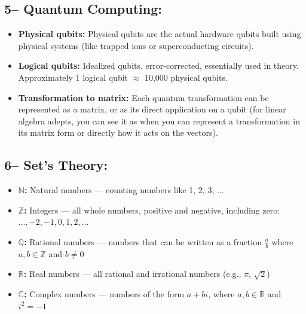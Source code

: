 \subsection*{5– Quantum Computing:}
\begin{itemize}
    \item \textbf{Physical qubits:} Physical qubits are the actual hardware qubits built using physical systems (like trapped ions or superconducting circuits).

    \item \textbf{Logical qubits:} Idealized qubits, error-corrected, essentially used in theory. Approximately 1 logical qubit \( \approx \) 10,000 physical qubits.

    \item \textbf{Transformation to matrix:} Each quantum transformation can be represented as a matrix, or as its direct application on a qubit (for linear algebra adepts, you can see it as when you can represent a transformation in its matrix form or directly how it acts on the vectors).
\end{itemize}

\subsection*{6– Set’s Theory:}   
\begin{itemize}
    \item \textbf{\( \mathbb{N} \):} Natural numbers — counting numbers like 1, 2, 3, ...

    \item \textbf{\( \mathbb{Z} \):} Integers — all whole numbers, positive and negative, including zero: \( ..., -2, -1, 0, 1, 2, ... \)

    \item \textbf{\( \mathbb{Q} \):} Rational numbers — numbers that can be written as a fraction \( \frac{a}{b} \) where \( a, b \in \mathbb{Z} \) and \( b \neq 0 \)

    \item \textbf{\( \mathbb{R} \):} Real numbers — all rational and irrational numbers (e.g., \( \pi \), \( \sqrt{2} \))

    \item \textbf{\( \mathbb{C} \):} Complex numbers — numbers of the form \( a + bi \), where \( a, b \in \mathbb{R} \) and \( i^2 = -1 \)
\end{itemize}

